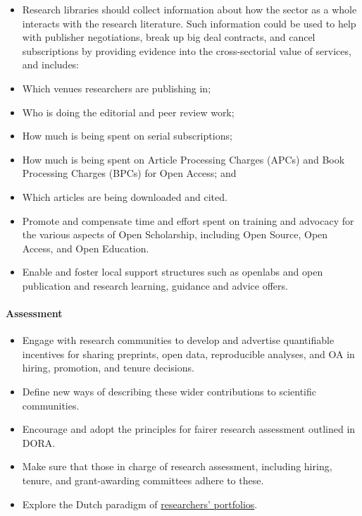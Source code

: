 \begin{itemize}
\item
  Research libraries should collect information about how the sector as
  a whole interacts with the research literature. Such information could
  be used to help with publisher negotiations, break up big deal
  contracts, and cancel subscriptions by providing evidence into the
  cross-sectorial value of services, and includes:
\item
  Which venues researchers are publishing in;
\item
  Who is doing the editorial and peer review work;
\item
  How much is being spent on serial subscriptions;
\item
  How much is being spent on Article Processing Charges (APCs) and Book
  Processing Charges (BPCs) for Open Access; and
\item
  Which articles are being downloaded and cited.
\item
  Promote and compensate time and effort spent on training and advocacy
  for the various aspects of Open Scholarship, including Open Source,
  Open Access, and Open Education.
\item
  Enable and foster local support structures such as openlabs and open
  publication and research learning, guidance and advice offers.
\end{itemize}

\paragraph{Assessment}\label{assessment-2}

\begin{itemize}
\item
  Engage with research communities to develop and advertise quantifiable
  incentives for sharing preprints, open data, reproducible analyses,
  and OA in hiring, promotion, and tenure decisions.
\item
  Define new ways of describing these wider contributions to scientific
  communities.
\item
  Encourage and adopt the principles for fairer research assessment
  outlined in DORA.
\item
  Make sure that those in charge of research assessment, including
  hiring, tenure, and grant-awarding committees adhere to these.
\item
  Explore the Dutch paradigm of
  \href{https://openworking.wordpress.com/2018/06/24/changing-the-academic-reward-system-the-umc-utrecht-perspective/}{researchers'
  portfolios}.
\end{itemize}

